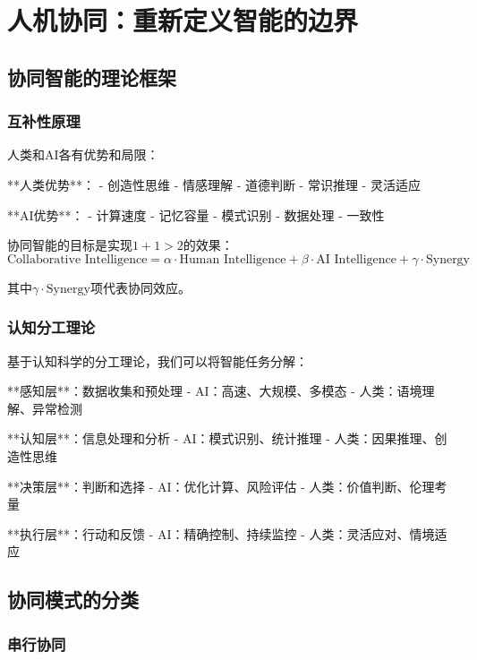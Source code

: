 \section{人机协同：重新定义智能的边界}

\subsection{协同智能的理论框架}

\subsubsection{互补性原理}

人类和AI各有优势和局限：

**人类优势**：
- 创造性思维
- 情感理解
- 道德判断
- 常识推理
- 灵活适应

**AI优势**：
- 计算速度
- 记忆容量
- 模式识别
- 数据处理
- 一致性

协同智能的目标是实现$1+1>2$的效果：
\begin{equation}
\text{Collaborative Intelligence} = \alpha \cdot \text{Human Intelligence} + \beta \cdot \text{AI Intelligence} + \gamma \cdot \text{Synergy}
\end{equation}

其中$\gamma \cdot \text{Synergy}$项代表协同效应。

\subsubsection{认知分工理论}

基于认知科学的分工理论，我们可以将智能任务分解：

**感知层**：数据收集和预处理
- AI：高速、大规模、多模态
- 人类：语境理解、异常检测

**认知层**：信息处理和分析
- AI：模式识别、统计推理
- 人类：因果推理、创造性思维

**决策层**：判断和选择
- AI：优化计算、风险评估
- 人类：价值判断、伦理考量

**执行层**：行动和反馈
- AI：精确控制、持续监控
- 人类：灵活应对、情境适应

\subsection{协同模式的分类}

\subsubsection{串行协同}

